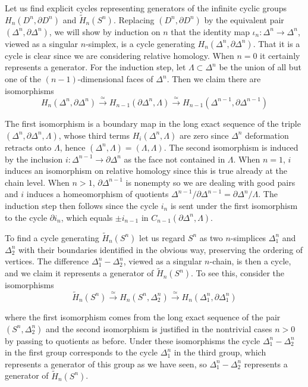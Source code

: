 \begin{example}
\label{ex:cycles-spheres-disks}
Let us find explicit cycles representing generators of the infinite cyclic groups $H_n(D^n,\partial D^n)$ and $\tilde{H}_n(S^n)$. Replacing $(D^n, \partial D^n)$ by the equivalent pair $(\Delta^n, \partial\Delta^n)$, we will show by induction on $n$ that the identity map $\iota_n:\Delta^n\to\Delta^n$, viewed as a singular $n$-simplex, is a cycle generating $H_n(\Delta^n, \partial\Delta^n)$. That it is a cycle is clear since we are considering relative homology. When $n = 0$ it certainly represents a generator. For the induction step, let $\Lambda \subset \Delta^n$ be the union of all but one of the $(n-1)$-dimensional faces of $\Delta^n$. Then we claim there are isomorphisms
\[H_n(\Delta^n, \partial\Delta^n) \xrightarrow{\simeq} H_{n-1}(\partial\Delta^n, \Lambda) \xrightarrow{\simeq} H_{n-1}(\Delta^{n-1}, \partial\Delta^{n-1})\]

The first isomorphism is a boundary map in the long exact sequence of the triple $(\Delta^n, \partial\Delta^n, \Lambda)$, whose third terms $H_i(\Delta^n, \Lambda)$ are zero since $\Delta^n$ deformation retracts onto $\Lambda$, hence $(\Delta^n, \Lambda) = (\Lambda, \Lambda)$. The second isomorphism is induced by the inclusion $i:\Delta^{n-1}\to\partial\Delta^n$ as the face not contained in $\Lambda$. When $n = 1$, $i$ induces an isomorphism on relative homology since this is true already at the chain level. When $n > 1$, $\partial\Delta^{n-1}$ is nonempty so we are dealing with good pairs and $i$ induces a homeomorphism of quotients $\Delta^{n-1}/\partial\Delta^{n-1} = \partial\Delta^n/\Lambda$. The induction step then follows since the cycle $i_n$ is sent under the first isomorphism to the cycle $\partial i_n$, which equals $\pm i_{n-1}$ in $C_{n-1}(\partial\Delta^n, \Lambda)$.

To find a cycle generating $\tilde{H}_n(S^n)$ let us regard $S^n$ as two $n$-simplices $\Delta_1^n$ and $\Delta_2^n$ with their boundaries identified in the obvious way, preserving the ordering of vertices. The difference $\Delta_1^n - \Delta_2^n$, viewed as a singular $n$-chain, is then a cycle, and we claim it represents a generator of $\tilde{H}_n(S^n)$. To see this, consider the isomorphisms
\[\tilde{H}_n(S^n) \xrightarrow{\simeq} H_n(S^n, \Delta_2^n) \xrightarrow{\simeq} H_n(\Delta_1^n, \partial\Delta_1^n)\]

where the first isomorphism comes from the long exact sequence of the pair $(S^n, \Delta_2^n)$ and the second isomorphism is justified in the nontrivial cases $n > 0$ by passing to quotients as before. Under these isomorphisms the cycle $\Delta_1^n - \Delta_2^n$ in the first group corresponds to the cycle $\Delta_1^n$ in the third group, which represents a generator of this group as we have seen, so $\Delta_1^n - \Delta_2^n$ represents a generator of $\tilde{H}_n(S^n)$.
\end{example}

